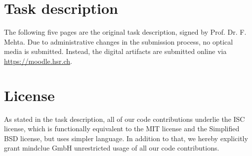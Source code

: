 \documentclass[a4paper]{report}
\begin{document}
\chapter{Task description}\label{ch:task-desc}
The following five pages are the original task description, signed by Prof. Dr.
F. Mehta. Due to administrative changes in the submission process, no optical
media is submitted. Instead, the digital artifacts are submitted online via
\url{https://moodle.hsr.ch}.




\chapter{License}
As stated in the task description, all of our code contributions underlie the
ISC license, which is functionally equivalent to the MIT license and the
Simplified BSD license, but uses simpler language. In addition to that, we
hereby explicitly grant mindclue GmbH unrestricted usage of all our code
contributions.







\end{document}
